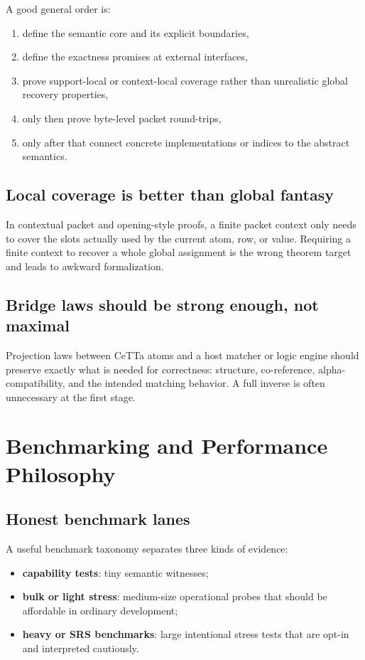 \documentclass[11pt]{article}
\newcommand{\strong}[1]{\textbf{#1}}
\begin{document}
A good general order is:

\begin{enumerate}
  \item define the semantic core and its explicit boundaries,
  \item define the exactness promises at external interfaces,
  \item prove support-local or context-local coverage rather than unrealistic global recovery properties,
  \item only then prove byte-level packet round-trips,
  \item only after that connect concrete implementations or indices to the abstract semantics.
\end{enumerate}

\subsection{Local coverage is better than global fantasy}

In contextual packet and opening-style proofs, a finite packet context only needs to cover the slots actually used by the current atom, row, or value. Requiring a finite context to recover a whole global assignment is the wrong theorem target and leads to awkward formalization.

\subsection{Bridge laws should be strong enough, not maximal}

Projection laws between CeTTa atoms and a host matcher or logic engine should preserve exactly what is needed for correctness: structure, co-reference, alpha-compatibility, and the intended matching behavior. A full inverse is often unnecessary at the first stage.

\section{Benchmarking and Performance Philosophy}

\subsection{Honest benchmark lanes}

A useful benchmark taxonomy separates three kinds of evidence:

\begin{itemize}
  \item \strong{capability tests}: tiny semantic witnesses;
  \item \strong{bulk or light stress}: medium-size operational probes that should be affordable in ordinary development;
  \item \strong{heavy or SRS benchmarks}: large intentional stress tests that are opt-in and interpreted cautiously.
\end{itemize}
\end{document}
